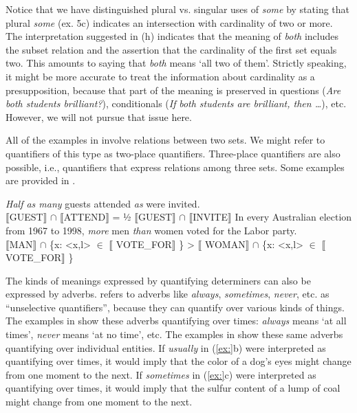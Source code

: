 Notice that we have distinguished plural vs. singular uses of \textit{some} by stating that plural \textit{some} (ex. 5c) indicates an intersection with cardinality of two or more. The interpretation suggested in (h) indicates that the meaning of \textit{both} includes the subset relation and the assertion that the cardinality of the first set equals two. This amounts to saying that \textit{both} means ‘all two of them’. Strictly speaking, it might be more accurate to treat the information about cardinality as a presupposition, because that part of the meaning is preserved in questions (\textit{Are} \textit{both students brilliant?}), conditionals (\textit{If} \textit{both students are brilliant, then …}), etc. However, we will not pursue that issue here.



All of the examples in  involve relations between two sets. We might refer to quantifiers of this type as two-place quantifiers. Three-place quantifiers are also possible, i.e., quantifiers that express relations among three sets. Some examples are provided in .


\ea
\ea  \textit{Half as many} guests attended \textit{as} were invited.\\
\textsc{{\textbar}} \textsc{$\llbracket$}GUEST$\rrbracket$  ${\cap}$ \textsc{$\llbracket$}ATTEND$\rrbracket$  {\textbar}  =  ½\textsc{{\textbar}} \textsc{$\llbracket$}GUEST$\rrbracket$  ${\cap}$ \textsc{$\llbracket$}INVITE$\rrbracket$  {\textbar}
\ex In every Australian election from 1967 to 1998, \textit{more} men \textit{than} women voted for the Labor party.\\
{\textbar} \textsc{$\llbracket$}MAN$\rrbracket$  ${\cap}$ \{x: <x,l> ${\in}$ $\llbracket$ VOTE\_FOR$\rrbracket$ \}{\textbar}  >  {\textbar} \textsc{$\llbracket$ WO}MAN$\rrbracket$  ${\cap}$ \{x: <x,l> ${\in}$ $\llbracket$ VOTE\_FOR$\rrbracket$ \}{\textbar}
\z \z


The kinds of meanings expressed by quantifying determiners can also be expressed by adverbs. \citet{Lewis1975} refers to adverbs like \textit{always}, \textit{sometimes}, \textit{never}, etc. as “unselective quantifiers”, because they can quantify over various kinds of things. The examples in  show these adverbs quantifying over times: \textit{always} means ‘at all times’, \textit{never} means ‘at no time’, etc. The examples in  show these same adverbs quantifying over individual entities. If \textit{usually} in (\ref{ex:}b) were interpreted as quantifying over times, it would imply that the color of a dog’s eyes might change from one moment to the next. If \textit{sometimes} in (\ref{ex:}c) were interpreted as quantifying over times, it would imply that the sulfur content of a lump of coal might change from one moment to the next.



